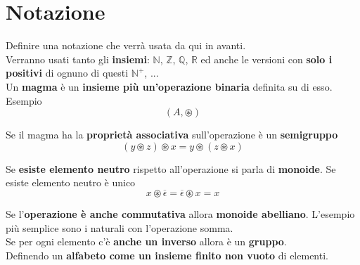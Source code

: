 \documentclass[11pt]{article}
\begin{document}
	\initcurrdate
	\maketitle 									%
	\newcommand{\nn}{\hfill \\}
	
	\tableofcontents
	
	\newpage
	
	\section{Notazione}
	
	Definire una notazione che verrà usata da qui in avanti. \\
	
	Verranno usati tanto gli \textbf{insiemi}: $\mathbb{N}$, $\mathbb{Z}$, $\mathbb{Q}$, $\mathbb{R}$ ed anche le versioni con \textbf{solo i positivi} di ognuno di questi $\mathbb{N}^+$, ... \\
	
	Un \textbf{magma} è un \textbf{insieme più un'operazione binaria} definita su di esso. Esempio
	$$ (A, \circledast) $$
	
	Se il magma ha la \textbf{proprietà associativa} sull'operazione è un \textbf{semigruppo}
	$$ (y \circledast z) \circledast x = y \circledast (z \circledast x) $$
	
	Se \textbf{esiste elemento neutro} rispetto all'operazione si parla di \textbf{monoide}. Se esiste elemento neutro è unico
	$$ x \circledast \overline{\epsilon} = \overline{\epsilon} \circledast x = x $$
	
	Se l'\textbf{operazione è anche commutativa} allora \textbf{monoide abelliano}. L'esempio più semplice sono i naturali con l'operazione somma. \\
	
	Se per ogni elemento c'è \textbf{anche un inverso} allora è un \textbf{gruppo}. \\
	
	Definendo un \textbf{alfabeto come un insieme finito non vuoto} di elementi. \\
	
\end{document}
